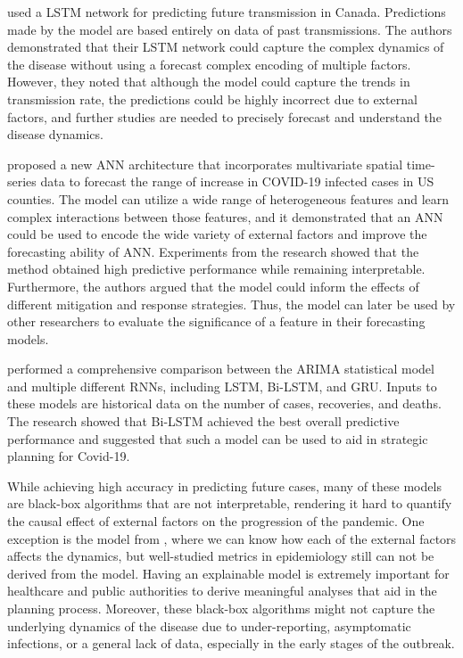\citeauthor{chimmulaTimeSeriesForecasting2020} \cite{chimmulaTimeSeriesForecasting2020} used a \gls{LSTM} network for predicting future transmission in Canada.
Predictions made by the model are based entirely on data of past transmissions.
The authors demonstrated that their \gls{LSTM} network could capture the complex dynamics of the disease without using a forecast complex encoding of multiple factors.
However, they noted that although the model could capture the trends in transmission rate, the predictions could be highly incorrect due to external factors, and further studies are needed to precisely forecast and understand the disease dynamics.

\citeauthor{ramchandaniDeepCOVIDNetInterpretableDeep2020} \cite{ramchandaniDeepCOVIDNetInterpretableDeep2020} proposed a new \gls{ANN} architecture that incorporates multivariate spatial time-series data to forecast the range of increase in COVID-19 infected cases in \gls{US} counties.
The model can utilize a wide range of heterogeneous features and learn complex interactions between those features, and it demonstrated that an \gls{ANN} could be used to encode the wide variety of external factors and improve the forecasting ability of \gls{ANN}.
Experiments from the research showed that the method obtained high predictive performance while remaining interpretable.
Furthermore, the authors argued that the model could inform the effects of different mitigation and response strategies.
Thus, the model can later be used by other researchers to evaluate the significance of a feature in their forecasting models.

\citeauthor{shahidPredictionsCOVID19Deep2020} \cite{shahidPredictionsCOVID19Deep2020} performed a comprehensive comparison between the \gls{ARIMA} statistical model and multiple different \glspl{RNN}, including \gls{LSTM}, \gls{Bi-LSTM}, and \gls{GRU}.
Inputs to these models are historical data on the number of cases, recoveries, and deaths.
The research showed that \gls{Bi-LSTM} achieved the best overall predictive performance and suggested that such a model can be used to aid in strategic planning for Covid-19.

While achieving high accuracy in predicting future cases, many of these models are black-box algorithms that are not interpretable, rendering it hard to quantify the causal effect of external factors on the progression of the pandemic.
One exception is the model from \cite{ramchandaniDeepCOVIDNetInterpretableDeep2020}, where we can know how each of the external factors affects the dynamics, but well-studied metrics in epidemiology still can not be derived from the model.
Having an explainable model is extremely important for healthcare and public authorities to derive meaningful analyses that aid in the planning process.
Moreover, these black-box algorithms might not capture the underlying dynamics of the disease due to under-reporting, asymptomatic infections, or a general lack of data, especially in the early stages of the outbreak.

